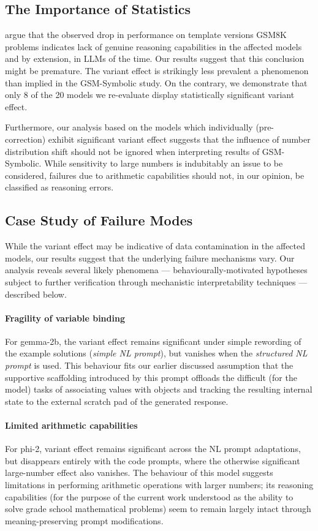 \documentclass[11pt]{article}
\begin{document}
\subsection{The Importance of Statistics}
\citeauthor{mirzadeh2025gsm} argue that the observed drop in performance on template versions GSM8K problems indicates lack of genuine reasoning capabilities in the affected models and by extension, in LLMs of the time. Our results suggest that this conclusion might be premature. The variant effect is strikingly less prevalent a phenomenon than implied in the GSM-Symbolic study. On the contrary, we demonstrate that only 8 of the 20 models we re-evaluate display statistically significant variant effect. 

Furthermore, our analysis based on the models which individually (pre-correction) exhibit significant variant effect suggests that the influence of number distribution shift should not be ignored when interpreting results of GSM-Symbolic. While sensitivity to large numbers is indubitably an issue to be considered, failures due to arithmetic capabilities should not, in our opinion, be classified as reasoning errors.

\subsection{Case Study of Failure Modes}
While the variant effect may be indicative of data contamination in the affected models, our results suggest that the underlying failure mechanisms vary. Our analysis reveals several likely phenomena --- behaviourally-motivated hypotheses subject to further verification through mechanistic interpretability techniques --- described below.

\paragraph{Fragility of variable binding}
For gemma-2b, the variant effect remains significant under simple rewording of the example solutions (\textit{simple NL prompt}), but vanishes when the \textit{structured NL prompt} is used. This behaviour fits our earlier discussed assumption that the supportive scaffolding introduced by this prompt offloads the difficult (for the model) tasks of associating values with objects and tracking the resulting internal state to the external scratch pad of the generated response.

\paragraph{Limited arithmetic capabilities}
For phi-2, variant effect remains significant across the NL prompt adaptations, but disappears entirely with the code prompts, where the otherwise significant large-number effect also vanishes. The behaviour of this model suggests limitations in performing arithmetic operations with larger numbers; its reasoning capabilities (for the purpose of the current work understood as the ability to solve grade school mathematical problems) seem to remain largely intact through meaning-preserving prompt modifications.
\end{document}
